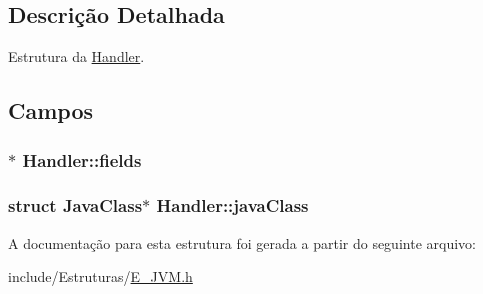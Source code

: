 \subsection{Descrição Detalhada}
Estrutura da \hyperlink{struct_handler}{Handler}. 

\subsection{Campos}
\hypertarget{struct_handler_ab880a8f45a9b1c69a21372e72f407028}{}
\subsubsection[{fields}]{$\ast$ Handler\+::fields}\label{struct_handler_ab880a8f45a9b1c69a21372e72f407028}
\hypertarget{struct_handler_a0d23c9897e6fa7293405ac2ba8321efb}{}
\subsubsection[{java\+Class}]{\setlength{\rightskip}{0pt plus 5cm}struct {\bf Java\+Class}$\ast$ Handler\+::java\+Class}\label{struct_handler_a0d23c9897e6fa7293405ac2ba8321efb}


A documentação para esta estrutura foi gerada a partir do seguinte arquivo\+:\begin{DoxyCompactItemize}
\item 
include/\+Estruturas/\hyperlink{_e___j_v_m_8h}{E\+\_\+\+J\+V\+M.\+h}\end{DoxyCompactItemize}

